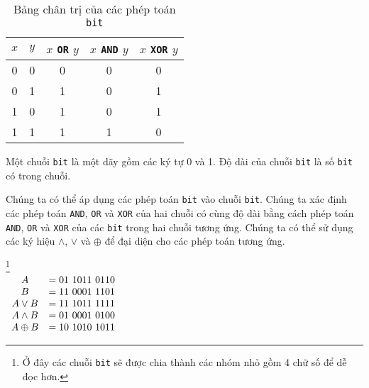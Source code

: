 \documentclass[11pt,fleqn]{book} %
\begin{document}
        \begin{table}[h!]
            \centering
            \setlength{\tabcolsep}{19pt}
            \begin{tabular}{c c c c c}
                $x$ & $y$ & $x$ \texttt{OR} $y$ & $x$ \texttt{AND} $y$ & $x$ \texttt{XOR} $y$\\ \hline
                0 & 0 & 0 & 0 & 0\\ 
                0 & 1 & 1 & 0 & 1\\
                1 & 0 & 1 & 0 & 1\\
                1 & 1 & 1 & 1 & 0
            \end{tabular}
            \caption{Bảng chân trị của các phép toán \texttt{bit}}
        \end{table}
        
        \begin{definition}
            Một chuỗi \texttt{bit} là một dãy gồm các ký tự 0 và 1. Độ dài của chuỗi \texttt{bit} là số \texttt{bit} có trong chuỗi.
        \end{definition}
        
        Chúng ta có thể áp dụng các phép toán \texttt{bit} vào chuỗi \texttt{bit}. Chúng ta xác định các phép toán \texttt{AND}, \texttt{OR} và \texttt{XOR} của hai chuỗi có cùng độ dài bằng cách phép toán \texttt{AND}, \texttt{OR} và \texttt{XOR} của các \texttt{bit} trong hai chuỗi tương ứng. Chúng ta có thể sử dụng các ký hiệu $\land$, $\lor$ và $\oplus$ để đại diện cho các phép toán tương ứng.
        
        \begin{example}\footnote{
                Ở đây các chuỗi \texttt{bit} sẽ được chia thành các nhóm nhỏ gồm 4 chữ số để dễ đọc hơn.
                }\ \\
            $\begin{array}{c l}
                A &= 01\ 1011\ 0110\\
                B &= 11\ 0001\ 1101\\
                A \lor B &= 11\ 1011\ 1111\\
                A \land B &= 01\ 0001\ 0100\\
                A \oplus B &= 10\ 1010\ 1011
            \end{array}$
        \end{example}

\end{document}
